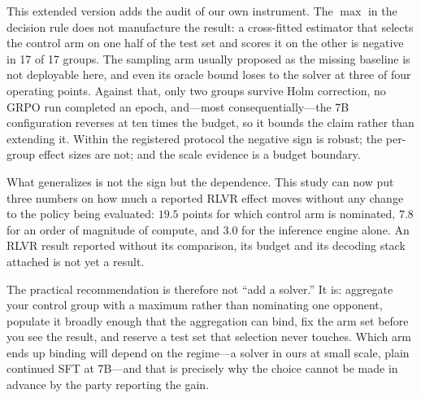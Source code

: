 This extended version adds the audit of our own instrument. The $\max$ in the
decision rule does not manufacture the result: a cross-fitted estimator that
selects the control arm on one half of the test set and scores it on the other
is negative in 17 of 17 groups. The sampling arm usually proposed as the missing
baseline is not deployable here, and even its oracle bound loses to the solver
at three of four operating points. Against that, only two groups survive Holm
correction, no GRPO run completed an epoch, and---most consequentially---the 7B
configuration reverses at ten times the budget, so it bounds the claim rather
than extending it. Within the registered protocol the negative sign is robust;
the per-group effect sizes are not; and the scale evidence is a budget boundary.

What generalizes is not the sign but the dependence. This study can now put
three numbers on how much a reported RLVR effect moves without any change to the
policy being evaluated: $19.5$ points for which control arm is nominated,
$7.8$ for an order of magnitude of compute, and $3.0$ for the inference engine
alone. An RLVR result reported without its comparison, its budget and its
decoding stack attached is not yet a result.

The practical recommendation is therefore not ``add a solver.'' It is: aggregate
your control group with a maximum rather than nominating one opponent, populate
it broadly enough that the aggregation can bind, fix the arm set before you see
the result, and reserve a test set that selection never touches. Which arm ends
up binding will depend on the regime---a solver in ours at small scale, plain
continued SFT at 7B---and that is precisely why the choice cannot be made in
advance by the party reporting the gain.
